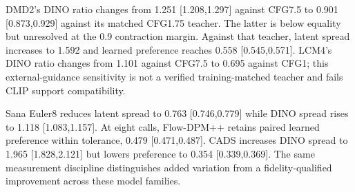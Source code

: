 DMD2's DINO ratio changes from 1.251 [1.208,1.297] against CFG7.5 to
0.901 [0.873,0.929] against its matched CFG1.75 teacher. The latter is
below equality but unresolved at the 0.9 contraction margin. Against that
teacher, latent spread increases to 1.592 and learned preference reaches
0.558 [0.545,0.571]. LCM4's DINO ratio changes from 1.101 against CFG7.5
to 0.695 against CFG1; this external-guidance sensitivity is not a verified
training-matched teacher and fails CLIP support compatibility.

Sana Euler8 reduces latent spread to 0.763 [0.746,0.779] while DINO spread
rises to 1.118 [1.083,1.157]. At eight calls, Flow-DPM++ retains paired
learned preference within tolerance, 0.479 [0.471,0.487]. CADS increases
DINO spread to 1.965 [1.828,2.121] but lowers preference to
0.354 [0.339,0.369]. The same measurement discipline distinguishes added
variation from a fidelity-qualified improvement across these model families.
